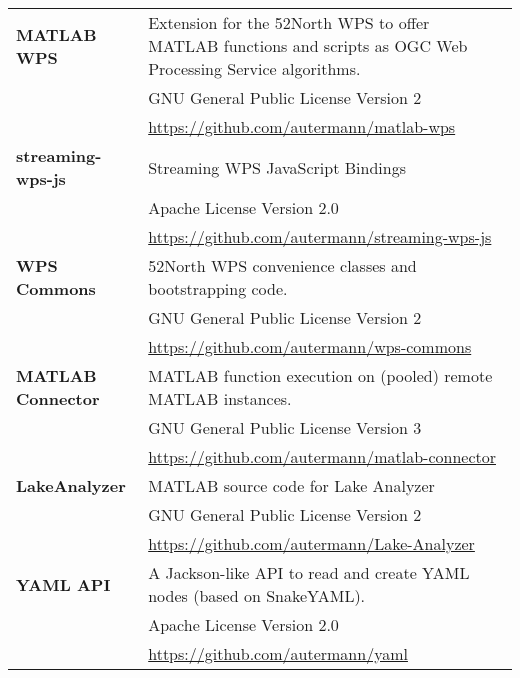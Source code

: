 \documentclass[paper=a4,
               fontsize=11pt,
               bibliography=totoc,
               listof=nochaptergap,
               listof=notoc,
               numbers=noendperiod,
               parskip=half,
               footnotes=multiple,
               toc=numberline,
               captions=tableheading,
               DIV=10,
              ]{scrreprt}
\newcommand{\ftn}{52\textdegree{}North\xspace}
\begin{document}
\begin{appendix}
\begin{center}
\begin{small}
\begin{tabularx}{\textwidth}{@{}lX@{}}
            \textbf{MATLAB WPS}
            & Extension for the \ftn WPS to offer MATLAB functions and scripts as OGC Web Processing Service algorithms.\\
            & GNU General Public License Version 2\\
            & \url{https://github.com/autermann/matlab-wps}\\
            \cmidrule(r){1-1}
            \cmidrule(l){2-2}

            \textbf{streaming-wps-js}
            & Streaming WPS JavaScript Bindings\\
            & Apache License Version 2.0\\
            & \url{https://github.com/autermann/streaming-wps-js}\\
            \cmidrule(r){1-1}
            \cmidrule(l){2-2}

            \textbf{WPS Commons}
            & \ftn WPS convenience classes and bootstrapping code.\\
            & GNU General Public License Version 2\\
            & \url{https://github.com/autermann/wps-commons}\\
            \cmidrule(r){1-1}
            \cmidrule(l){2-2}

            \textbf{MATLAB Connector}
            & MATLAB function execution on (pooled) remote MATLAB instances.\\
            & GNU General Public License Version 3\\
            & \url{https://github.com/autermann/matlab-connector}\\
            \cmidrule(r){1-1}
            \cmidrule(l){2-2}

            \textbf{LakeAnalyzer}
            & MATLAB source code for Lake Analyzer\\
            & GNU General Public License Version 2\\
            & \url{https://github.com/autermann/Lake-Analyzer}\\
            \cmidrule(r){1-1}
            \cmidrule(l){2-2}

            \textbf{YAML API}
            & A Jackson-like API to read and create YAML nodes (based on SnakeYAML).\\
            & Apache License Version 2.0\\
            & \url{https://github.com/autermann/yaml}\\
            \bottomrule
          \end{tabularx}
        \end{small}
      \end{center}



\end{appendix}
\end{document}
